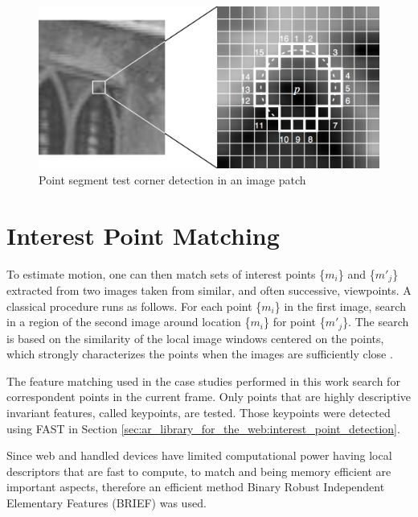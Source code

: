 \begin{figure}[!htb]
  \centering
  \includegraphics[width=\linewidth]{chapters/computer_vision_library_for_the_web/fast.png}
  \caption{Point segment test corner detection in an image patch \cite{Glass2013}}
  \label{figure:fast}
\end{figure}


\section{Interest Point Matching} %
\label{sec:ar_library_for_the_web:interest_point_matching}

To estimate motion, one can then match sets of interest points \{$m_{i}$\} and \{$m'_{j}$\} extracted from two images taken from similar, and often successive, viewpoints. A classical procedure \cite{Calonder2010} runs as follows. For each point \{$m_{i}$\} in the first image, search in a region of the second image around location \{$m_{i}$\} for point \{$m'_{j}$\}. The search is based on the similarity of the local image windows centered on the points, which strongly characterizes the points when the images are sufficiently close \cite{Lepetit2005}.

The feature matching used in the case studies performed in this work search for correspondent points in the current frame. Only points that are highly descriptive invariant features, called keypoints, are tested. Those keypoints were detected using FAST \cite{Rosten2010} in Section \ref{sec:ar_library_for_the_web:interest_point_detection}.

Since web and handled devices have limited computational power having local descriptors that are fast to compute, to match and being memory efficient are important aspects, therefore an efficient method Binary Robust Independent Elementary Features (BRIEF) \cite{Calonder2010} was used.

